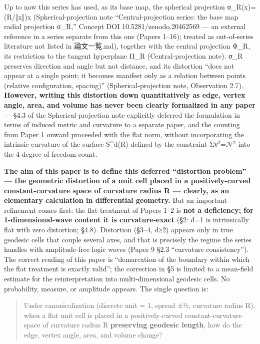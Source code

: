 \documentclass[
]{ltjsarticle}
\begin{document}
Up to now this series has used, as its base map, the spherical
projection σ\_R(x)=(R/‖x‖)x (Spherical-projection note
``Central-projection series: the base map radial projection σ\_R,''
Concept DOI 10.5281/zenodo.20462569 --- an external reference in a
series separate from this one (Papers 1--16); treated as out-of-series
literature not listed in 論文一覧.md), together with the central
projection Φ\_R, its restriction to the tangent hyperplane Π\_R
(Central-projection note). σ\_R preserves direction and angle but not
distance, and its distortion ``does not appear at a single point; it
becomes manifest only as a relation between points (relative
configuration, spacing)'' (Spherical-projection note, Observation 2.7).
\textbf{However, writing this distortion down quantitatively as edge,
vertex angle, area, and volume has never been clearly formalized in any
paper} --- §4.3 of the Spherical-projection note explicitly deferred the
formulation in terms of induced metric and curvature to a separate
paper, and the counting from Paper 1 onward proceeded with the flat
norm, without incorporating the intrinsic curvature of the surface
S\^{}d(R) defined by the constraint Σν\(^{2}\)=\(\mathcal{N}\)\(^{2}\)
into the 4-degree-of-freedom count.

\textbf{The aim of this paper is to define this deferred ``distortion
problem'' --- the geometric distortion of a unit cell placed in a
positively-curved constant-curvature space of curvature radius R ---
clearly, as an elementary calculation in differential geometry.} But an
important refinement comes first: the flat treatment of Papers 1--2 is
\textbf{not a deficiency; for 1-dimensional-wave content it is
curvature-exact} (§2: d=1 is intrinsically flat with zero distortion;
§4.8). Distortion (§3--4, d≥2) appears only in true geodesic cells that
couple several axes, and that is precisely the regime the series handles
with amplitude-free logic waves (Paper 9 §2.3 ``curvature
consistency''). The correct reading of this paper is ``demarcation of
the boundary within which the flat treatment is exactly valid''; the
correction in §5 is limited to a mean-field estimate for the
reinterpretation into multi-dimensional geodesic cells. No probability,
measure, or amplitude appears. The single question is:

\begin{quote}
Under canonicalization (discrete unit = 1, spread ±½, curvature radius
R), when a flat unit cell is placed in a positively-curved
constant-curvature space of curvature radius R \textbf{preserving
geodesic length}, how do the edge, vertex angle, area, and volume
change?
\end{quote}
\end{document}
